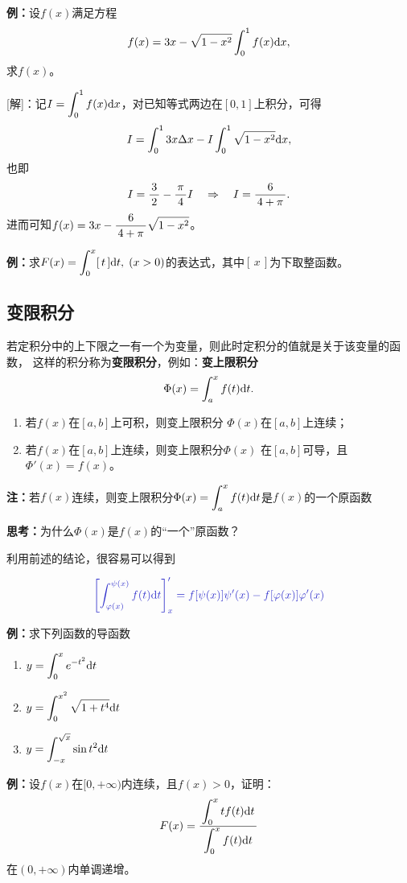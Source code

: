 {\bf 例：}设$f(x)$满足方程
$$f(x)=3x-\sqrt{1-x^2}\displaystyle\int_0^1f(x)\mathrm{d} x,$$
求$f(x)$。

[解]：记$I=\displaystyle\int_0^1f(x)\mathrm{d} x$，对已知等式两边在$[0,1]$上积分，可得
$$I=\displaystyle\int_0^13x\Delta x-I\displaystyle\int_0^1\sqrt{1-x^2}\mathrm{d} x,$$
也即
$$I=\displaystyle\frac{\,{3}\,}{\,{2}\,}-\displaystyle\frac{\,{\pi}\,}{\,{4}\,}I
\quad\Rightarrow\quad
I=\displaystyle\frac{\,{6}\,}{\,{4+\pi}\,}.$$
进而可知$f(x)=3x-\displaystyle\frac{\,{6}\,}{\,{4+\pi}\,}\sqrt{1-x^2}$。\fin

{\bf 例：}求$F(x)=\displaystyle\int_0^x[\,t\,]\mathrm{d} t,\;(x>0)$的表达式，其中$[\,x\,]$为下取整函数。

\subsection{变限积分}

若定积分中的上下限之一有一个为变量，则此时定积分的值就是关于该变量的函数，
这样的积分称为{\bf 变限积分}，例如：{\bf 变上限积分}
$$\Phi(x)=\displaystyle\int_a^xf(t)\mathrm{d} t.$$

\begin{thx}
	\begin{enumerate}
	  \item 若$f(x)$在$[a,b]$上可积，则变上限积分
		$\Phi(x)$在$[a,b]$上连续；
	  \item 若$f(x)$在$[a,b]$上连续，则变上限积分$\Phi(x)$
	    在$[a,b]$可导，且$\Phi'(x)=f(x)$。
	\end{enumerate}
\end{thx}

{\bf 注：}若$f(x)$连续，则变上限积分$\Phi(x)=\displaystyle\int_a^xf(t)\mathrm{d} t$是$f(x)$的一个原函数

{\bf 思考：}为什么$\Phi(x)$是$f(x)$的“一个”原函数？

利用前述的结论，很容易可以得到

\begin{thx}
	$${\b\left[\dint_{\varphi(x)}^{\psi(x)}f(t)\d t\right]'_x
	=f[\psi(x)]\psi'(x)-f[\varphi(x)]\varphi'(x)}$$
\end{thx}

{\bf 例：}求下列函数的导函数
\begin{enumerate}[(1)]
  \setlength{\itemindent}{1cm}
  \item $y=\displaystyle\int_0^{x}e^{-t^2}\mathrm{d} t$
  \item $y=\displaystyle\int_0^{x^2}\sqrt{1+t^4}\mathrm{d} t$
  \item $y=\displaystyle\int_{-x}^{\sqrt x}\sin t^2\mathrm{d} t$
\end{enumerate}

{\bf 例：}设$f(x)$在$[0,+\infty)$内连续，且$f(x)>0$，证明：
$$F(x)=\displaystyle\frac{\,{\displaystyle\int_0^xtf(t)\mathrm{d} t}\,}{\,{\displaystyle\int_0^xf(t)\mathrm{d} t}\,}$$
在$(0,+\infty)$内单调递增。


